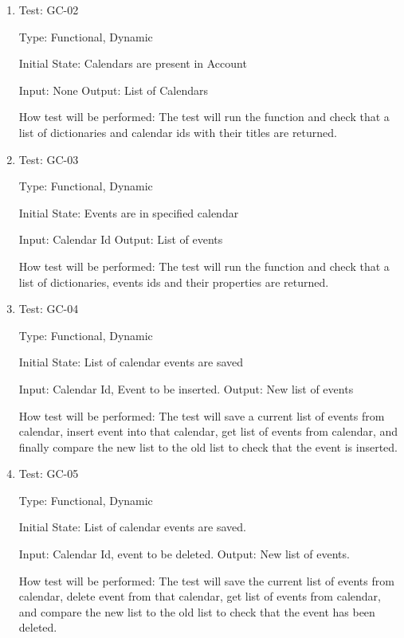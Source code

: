 \documentclass[12pt, titlepage]{article}
\begin{document}
\begin{enumerate}

\item{Test: GC-02\\}

Type: Functional, Dynamic
					
Initial State: Calendars are present in Account
					
Input: None
Output: List of Calendars
					
How test will be performed: The test will run the function and check that a list of dictionaries and calendar ids with their titles are returned.

\item{Test: GC-03\\}

Type: Functional, Dynamic
					
Initial State: Events are in specified calendar
					
Input: Calendar Id
Output: List of events
					
How test will be performed:  The test will run the function and check that a list of dictionaries, events ids and their properties are returned.

\item{Test: GC-04\\}

Type: Functional, Dynamic
					
Initial State: List of calendar events are saved
					
Input: Calendar Id, Event to be inserted.
Output: New list of events
					
How test will be performed: The test will save a current list of events from calendar, insert event into that calendar, get list of events from calendar, and finally compare the new list to the old list to check that the event is inserted. 

\item{Test: GC-05\\}

Type: Functional, Dynamic
					
Initial State: List of calendar events are saved.

					
Input: Calendar Id, event to be deleted. 
Output: New list of events.
					
How test will be performed: The test will save the current list of events from calendar, delete event from that calendar, get list of events from calendar, and compare the new list to the old list to check that the event has been deleted.

\end{enumerate}
\end{document}
